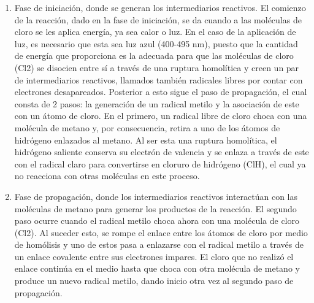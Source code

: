 \begin{enumerate}
    \item Fase de iniciación, donde se generan los intermediarios reactivos. El comienzo de la reacción, dado en la fase de iniciación, se da cuando a las moléculas de cloro se les aplica energía, ya sea calor o luz. En el caso de la aplicación de luz, es necesario que esta sea luz azul (400-495 nm), puesto que la cantidad de energía que proporciona es la adecuada para que las moléculas de cloro (Cl2) se disocien entre sí a través de una ruptura homolítica y creen un par de intermediarios reactivos, llamados también radicales libres por contar con electrones desapareados. Posterior a esto sigue el paso de propagación, el cual consta de 2 pasos: la generación de un radical metilo y la asociación de este con un átomo de cloro. En el primero, un radical libre de cloro choca con una molécula de metano y, por consecuencia, retira a uno de los átomos de hidrógeno enlazados al metano. Al ser esta una ruptura homolítica, el hidrógeno saliente conserva su electrón de valencia y se enlaza a través de este con el radical claro para convertirse en cloruro de hidrógeno (ClH), el cual ya no reacciona con otras moléculas en este proceso.
    
    \item Fase de propagación, donde los intermediarios reactivos interactúan con las moléculas de metano para generar los productos de la reacción. El segundo paso ocurre cuando el radical metilo choca ahora con una molécula de cloro (Cl2). Al suceder esto, se rompe el enlace entre los átomos de cloro por medio de homólisis y uno de estos pasa a enlazarse con el radical metilo a través de un enlace covalente entre sus electrones impares. El cloro que no realizó el enlace continúa en el medio hasta que choca con otra molécula de metano y produce un nuevo radical metilo, dando inicio otra vez al segundo paso de propagación.
        

\end{enumerate}
